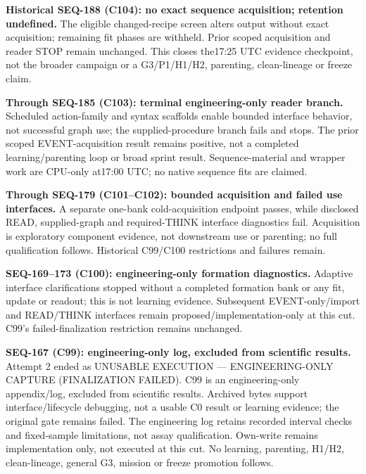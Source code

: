 \documentclass{article}
\begin{document}
\noindent\textbf{Historical SEQ-188 (C104): no exact sequence acquisition; retention undefined.}
The eligible changed-recipe screen alters output without exact acquisition;
remaining fit phases are withheld. Prior scoped acquisition and reader STOP
remain unchanged. This closes the17:25 UTC evidence checkpoint, not the
broader campaign or a G3/P1/H1/H2, parenting, clean-lineage or freeze claim.

\noindent\textbf{Through SEQ-185 (C103): terminal engineering-only reader branch.}
Scheduled action-family and syntax scaffolds enable bounded interface behavior,
not successful graph use; the supplied-procedure branch fails and stops.
The prior scoped EVENT-acquisition result remains positive, not a completed
learning/parenting loop or broad sprint result. Sequence-material and wrapper
work are CPU-only at17:00 UTC; no native sequence fits are claimed.

\noindent\textbf{Through SEQ-179 (C101--C102): bounded acquisition and failed use interfaces.}
A separate one-bank cold-acquisition endpoint passes, while disclosed READ,
supplied-graph and required-THINK interface diagnostics fail. Acquisition is
exploratory component evidence, not downstream use or parenting; no full
qualification follows. Historical C99/C100 restrictions and failures remain.

\noindent\textbf{SEQ-169--173 (C100): engineering-only formation diagnostics.}
Adaptive interface clarifications stopped without a completed formation bank
or any fit, update or readout; this is not learning evidence. Subsequent
EVENT-only/import and READ/THINK interfaces remain proposed/implementation-only
at this cut. C99's failed-finalization restriction remains unchanged.

\noindent\textbf{SEQ-167 (C99): engineering-only log, excluded from scientific results.}
Attempt 2 ended as UNUSABLE EXECUTION --- ENGINEERING-ONLY CAPTURE
(FINALIZATION FAILED). C99 is an engineering-only appendix/log, excluded from
scientific results. Archived bytes support interface/lifecycle debugging, not
a usable C0 result or learning evidence; the original gate remains failed.
The engineering log retains recorded interval checks and fixed-sample
limitations, not assay qualification. Own-write remains implementation only,
not executed at this cut. No learning, parenting, H1/H2, clean-lineage,
general G3, mission or freeze promotion follows.
\end{document}
